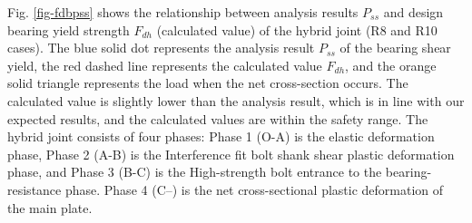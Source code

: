 Fig. \ref{fig-fdbpss} shows the relationship between analysis results $P_{ss}$ and design bearing yield strength $F_{dh}$ (calculated value) of the hybrid joint (R8 and R10 cases). The blue solid dot represents the analysis result $P_{ss}$ of the bearing shear yield, the red dashed line represents the calculated value $F_{dh}$, and the orange solid triangle represents the load when the net cross-section occurs. The calculated value is slightly lower than the analysis result, which is in line with our expected results, and the calculated values are within the safety range. The hybrid joint consists of four phases: Phase 1 (O-A) is the elastic deformation phase, Phase 2 (A-B) is the Interference fit bolt shank shear plastic deformation phase, and Phase 3 (B-C) is the High-strength bolt entrance to the bearing-resistance phase. Phase 4 (C–) is the net cross-sectional plastic deformation of the main plate. 

